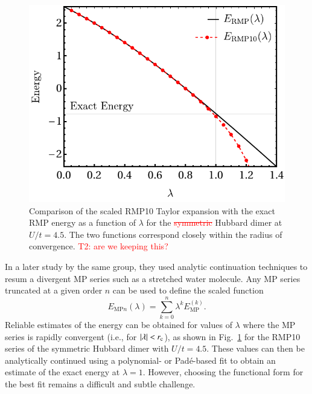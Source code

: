 \documentclass[aps,prb,reprint,noshowkeys,superscriptaddress]{revtex4-1}
\newcommand{\titou}[1]{\textcolor{red}{#1}}
\newcommand{\trash}[1]{\textcolor{red}{\sout{#1}}}
\newcommand{\latin}[1]{#1}
\newcommand{\ie}{\latin{i.e.}}
\newcommand{\rc}{r_{\text{c}}}
\begin{document}
\begin{figure}
    \includegraphics[width=\linewidth]{fig12}
    \caption{%
        Comparison of the scaled RMP10 Taylor expansion with the exact RMP energy as a function
        of $\lambda$ for the \trash{symmetric} Hubbard dimer at $U/t = 4.5$. 
        The two functions correspond closely within the radius of convergence.
        \titou{T2: are we keeping this?}
    }
    \label{fig:rmp_anal_cont}
\end{figure}

In a later study by the same group, they used analytic continuation techniques 
to resum a divergent MP series such as a stretched water molecule.\cite{Mihalka_2017a}
Any MP series truncated at a given order $n$ can be used to define the scaled function
\begin{equation}
   E_{\text{MP}n}(\lambda) = \sum_{k=0}^{n} \lambda^{k} E_\text{MP}^{(k)}.
\end{equation}
Reliable estimates of the energy can be obtained for values of $\lambda$ where the MP series is rapidly
convergent (\ie, for $\abs{\lambda} < \rc$), as shown in Fig.~\ref{fig:rmp_anal_cont} for the RMP10 series 
of the symmetric Hubbard dimer with $U/t = 4.5$.
These values can then be analytically continued using a polynomial- or Pad\'e-based fit to obtain an 
estimate of the exact energy at $\lambda = 1$.
However, choosing the functional form for the best fit remains a difficult and subtle challenge.
\end{document}
